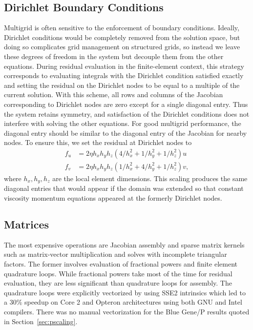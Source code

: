 \documentclass[final]{siamltex}
\begin{document}
\subsection{Dirichlet Boundary Conditions}\label{ssec:dirichlet}
Multigrid is often sensitive to the enforcement of boundary conditions.  Ideally, Dirichlet
conditions would be completely removed from the solution space, but doing so complicates grid
management on structured grids, so instead we leave these degrees of freedom in the system but
decouple them from the other equations.  During residual evaluation in the finite-element context,
this strategy corresponds to evaluating integrals with the Dirichlet condition satisfied exactly and setting
the residual on the Dirichlet nodes to be equal to a multiple of the current solution.  With this
scheme, all rows and columns of the Jacobian corresponding to Dirichlet nodes are zero except for a
single diagonal entry. Thus the system retains symmetry, and satisfaction of the Dirichlet conditions
does not interfere with solving the other equations.  For good multigrid performance, the diagonal
entry should be similar to the diagonal entry of the Jacobian for nearby nodes.  To ensure this, we
set the residual at Dirichlet nodes to
\begin{equation}\label{eq:dirichlet-scale}
  \begin{split}
    f_u &= 2 \eta h_xh_yh_z (4/h_x^2 + 1/h_y^2 + 1/h_z^2) u \\
    f_v &= 2 \eta h_xh_yh_z (1/h_x^2 + 4/h_y^2 + 1/h_z^2) v,
  \end{split}
\end{equation}
where $h_x,h_y,h_z$ are the local element dimensions.  This scaling produces the same diagonal
entries that would appear if the domain was extended so that constant viscosity momentum equations
appeared at the formerly Dirichlet nodes.

\subsection{Matrices}
The most expensive operations are Jacobian assembly and sparse matrix kernels such as matrix-vector multiplication and solves with incomplete triangular factors.
The former involves evaluation of fractional powers and finite element quadrature loops.  While fractional powers take most of the time for residual evaluation, they are less significant than quadrature loops for assembly.  The quadrature loops were explicitly vectorized by using SSE2 intrinsics which led to a 30\% speedup on Core 2 and Opteron architectures using both GNU and Intel compilers.  There was no manual vectorization for the Blue Gene/P results quoted in Section~\ref{sec:pscaling}.
\end{document}
